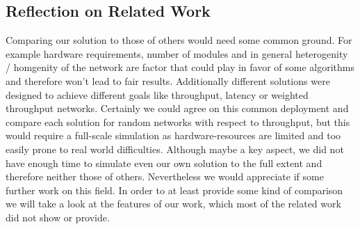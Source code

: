 \newpage
      
    \subsection{Reflection on Related Work}
      Comparing our solution to those of others would need some common ground. 
      For example hardware requirements, number of modules and in general heterogenity / homgenity of
      the network are factor that could play in favor of some algorithms and therefore won't lead to fair results. 
      Additionally different solutions were designed to achieve different goals like throughput, latency or weighted throughput networks. 
      Certainly we could agree on this common deployment and compare each solution for random networks with respect to throughput, 
      but this would require a full-scale simulation as hardware-resources are limited and too easily prone to real world difficulties.
      Although maybe a key aspect, we did not have enough time to simulate even our own solution to the full extent and therefore neither those of others. 
      Nevertheless we would appreciate if some further work on this field. 
      In order to at least provide some kind of comparison we will take a look at the features of our work, which most of the related work did not show or provide.
      
